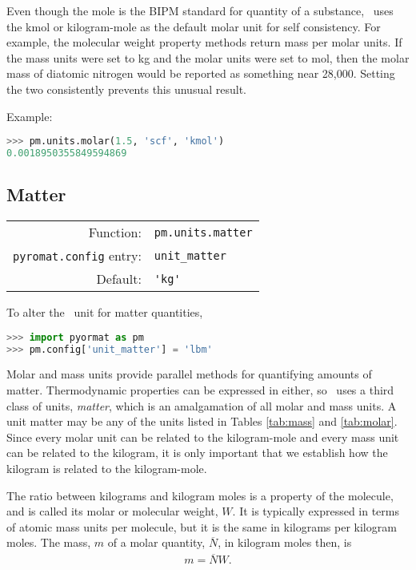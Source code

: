 Even though the mole is the BIPM standard for quantity of a substance, \PM\ uses the kmol or kilogram-mole as the default molar unit for self consistency.  For example, the molecular weight property methods return mass per molar units.  If the mass units were set to kg and the molar units were set to mol, then the molar mass of diatomic nitrogen would be reported as something near 28,000.  Setting the two consistently prevents this unusual result.


Example:
\begin{lstlisting}[language=Python]
>>> pm.units.molar(1.5, 'scf', 'kmol')
0.0018950355849594869
\end{lstlisting}


%
%

\subsection{Matter}\label{sec:units:matter}

\begin{tabular}{rl}
\hline
Function: & \verb|pm.units.matter|\\
\verb|pyromat.config| entry: & \verb|unit_matter|\\
Default: & \verb|'kg'|\\
\hline
\end{tabular}
\vspace{1em}

To alter the \PM\ unit for matter quantities,
\begin{lstlisting}[language=Python]
>>> import pyormat as pm
>>> pm.config['unit_matter'] = 'lbm'
\end{lstlisting}

Molar and mass units provide parallel methods for quantifying amounts of matter.  Thermodynamic properties can be expressed in either, so \PM\ uses a third class of units, \emph{matter}, which is an amalgamation of all molar and mass units.  A unit matter may be any of the units listed in Tables \ref{tab:mass} and \ref{tab:molar}.  Since every molar unit can be related to the kilogram-mole and every mass unit can be related to the kilogram, it is only important that we establish how the kilogram is related to the kilogram-mole.

The ratio between kilograms and kilogram moles is a property of the molecule, and is called its molar or molecular weight, $W$.  It is typically expressed in terms of atomic mass units per molecule, but it is the same in kilograms per kilogram moles.  The mass, $m$ of a molar quantity, $\overline{N}$, in kilogram moles then, is
\begin{align}
m = \overline{N} W.
\end{align}


